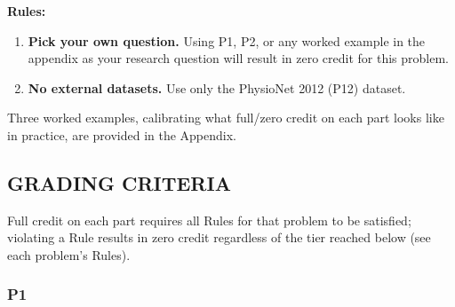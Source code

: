 \documentclass{article}
\begin{document}
\textbf{Rules:}
\begin{enumerate}
    \item \textbf{Pick your own question.} Using P1, P2, or any worked example in the appendix as your research question will result in zero credit for this problem.
    \item \textbf{No external datasets.} Use only the PhysioNet 2012 (P12) dataset.
\end{enumerate}

Three worked examples, calibrating what full/zero credit on each part looks like in practice, are provided in the Appendix.

\clearpage
\subsection*{GRADING CRITERIA}

Full credit on each part requires all Rules for that problem to be satisfied; violating a Rule results in zero credit regardless of the tier reached below (see each problem's Rules).

\subsubsection*{P1}
\end{document}
